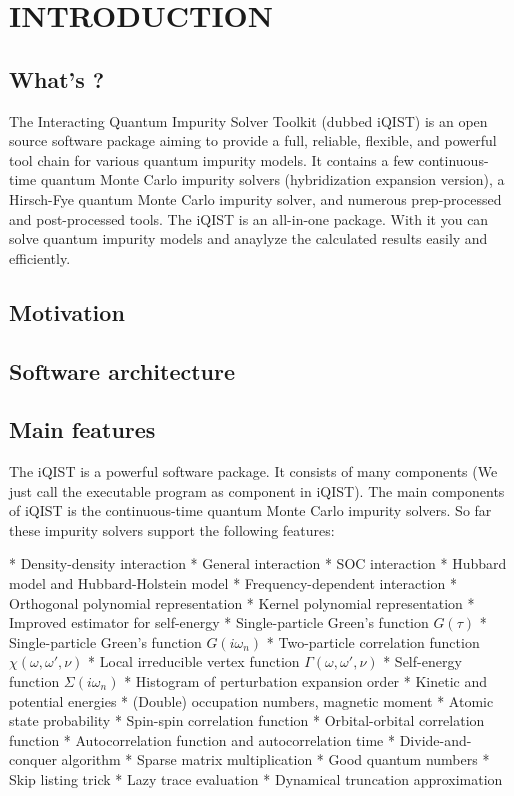 \chapter{INTRODUCTION}
\section{What's {\iqist}?}

The Interacting Quantum Impurity Solver Toolkit (dubbed iQIST) is an open
source software package aiming to provide a full, reliable, flexible, and
powerful tool chain for various quantum impurity models. It contains a few
continuous-time quantum Monte Carlo impurity solvers (hybridization
expansion version), a Hirsch-Fye quantum Monte Carlo impurity solver, and
numerous prep-processed and post-processed tools. The iQIST is an all-in-one
package. With it you can solve quantum impurity models and anaylyze the
calculated results easily and efficiently.


\section{Motivation}
\section{Software architecture}
\section{Main features}

The iQIST is a powerful software package. It consists of many components
(We just call the executable program as component in iQIST). The main
components of iQIST is the continuous-time quantum Monte Carlo impurity
solvers. So far these impurity solvers support the following features:

* Density-density interaction
* General interaction
* SOC interaction
* Hubbard model and Hubbard-Holstein model
* Frequency-dependent interaction
* Orthogonal polynomial representation
* Kernel polynomial representation
* Improved estimator for self-energy
* Single-particle Green’s function $G(\tau)$
* Single-particle Green’s function $G(i\omega_n)$
* Two-particle correlation function $\chi(\omega, \omega', \nu)$
* Local irreducible vertex function $\Gamma(\omega, \omega', \nu)$
* Self-energy function $\Sigma(i\omega_n)$
* Histogram of perturbation expansion order
* Kinetic and potential energies
* (Double) occupation numbers, magnetic moment
* Atomic state probability
* Spin-spin correlation function
* Orbital-orbital correlation function
* Autocorrelation function and autocorrelation time
* Divide-and-conquer algorithm
* Sparse matrix multiplication
* Good quantum numbers
* Skip listing trick
* Lazy trace evaluation
* Dynamical truncation approximation


